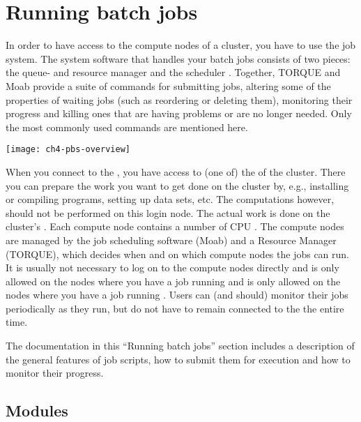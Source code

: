 \chapter{Running batch jobs}
\label{ch:running-batch-jobs}

In order to have access to the compute nodes of a cluster, you have to use
the job system. The system software that handles your batch jobs consists of
two pieces: the queue- and resource manager  and the scheduler
. Together, TORQUE and Moab provide a suite of commands for
submitting jobs, altering some of the properties of waiting jobs (such as
reordering or deleting them), monitoring their progress and killing ones that
are having problems or are no longer needed. Only the most commonly used
commands are mentioned here.

\begin{center}
\texttt{[image: ch4-pbs-overview]}
\end{center}

When you connect to the \hpc, you have access to (one of) the  of the cluster. There you can prepare the work you want to get done on
the cluster by, e.g., installing or compiling programs, setting up data sets,
etc. The computations however, should not be performed on this login node. The
actual work is done on the cluster's . Each compute node
contains a number of CPU . The compute nodes are managed by the
job scheduling software (Moab) and a Resource Manager (TORQUE), which decides
when and on which compute nodes the jobs can run. It is usually not necessary
to log on to the
compute nodes directly
\ifbrussel
and is only allowed on the nodes where you have a job running
\fi
\ifgent
and is only allowed on the nodes where you have a job running
\fi
. Users can (and should) monitor their jobs
periodically as they run, but do not have to remain connected to the \hpc the entire
time.

The documentation in this ``Running batch jobs'' section includes a description
of the general features of job scripts, how to submit them for execution and
how to monitor their progress.

\section{Modules}
\label{sec:modules}

